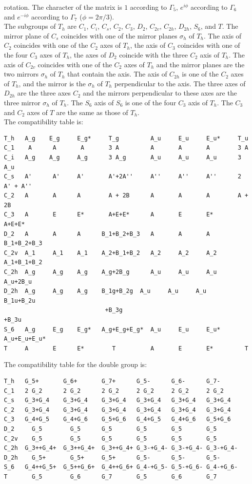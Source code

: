 \documentclass[12pt,a4paper]{article}
\begin{document}
rotation. The character of the matrix is $1$ according to 
$\Gamma_5$, $e^{i\phi}$ according to $\Gamma_6$ and $e^{-i\phi}$ according 
to $\Gamma_7$ ($\phi=2\pi/3$). \\
The subgroups of $T_h$ are $C_1$, $C_i$, $C_s$, $C_2$, $C_3$, $D_2$, $C_{2v}$,
$C_{2h}$, $D_{2h}$, $S_6$, and $T$. The mirror plane of $C_s$ coincides
with one of the mirror planes $\sigma_h$ of $T_h$. The axis of $C_2$ coincides 
with one of the $C_2$ axes of $T_h$, the axis of $C_3$ coincides with one of the four
$C_3$ axes of $T_h$, the axes of $D_2$ coincide with the three $C_2$ axis
of $T_h$. The axis of $C_{2v}$ coincides with one of the $C_2$ axes of 
$T_h$ and the mirror planes are the two mirrors $\sigma_h$ of $T_h$ that
contain the axis. The axis of $C_{2h}$ is one of the $C_2$ axes of $T_h$,
and the mirror is the $\sigma_h$ of $T_h$ perpendicular to the
axis. The three axes of $D_{2h}$ are the three axes $C_2$ and the mirrors
perpendicular to these axes are the three mirror $\sigma_h$ of $T_h$.
The $S_6$ axis of $S_6$ is one of the four $C_3$ axis of $T_h$.
The $C_3$ and $C_2$ axes of $T$ are the same as those of $T_h$. \\
The compatibility table is:
\begin{verbatim}
T_h   A_g    E_g     E_g*     T_g         A_u     E_u     E_u*     T_u
C_1    A      A       A       3 A         A       A       A        3 A
C_i   A_g    A_g     A_g      3 A_g       A_u     A_u     A_u      3 A_u
C_s   A'      A'     A'       A'+2A''     A''     A''     A''      2 A' + A''
C_2   A       A      A        A + 2B      A       A       A        A + 2B
C_3   A       E      E*       A+E+E*      A       E       E*       A+E+E*
D_2   A       A      A      B_1+B_2+B_3   A       A       A        B_1+B_2+B_3
C_2v  A_1     A_1    A_1    A_2+B_1+B_2   A_2     A_2     A_2      A_1+B_1+B_2
C_2h  A_g     A_g    A_g    A_g+2B_g      A_u     A_u     A_u      A_u+2B_u
D_2h  A_g     A_g    A_g    B_1g+B_2g  A_u     A_u     A_u         B_1u+B_2u
                             +B_3g                                   +B_3u
S_6   A_g     E_g    E_g*   A_g+E_g+E_g*  A_u     E_u     E_u*   A_u+E_u+E_u*
T     A       E      E*        T          A       E       E*         T
\end{verbatim}
The compatibility table for the double group is:
\begin{verbatim}
T_h   G_5+       G_6+       G_7+      G_5-      G_6-      G_7-
C_1   2 G_2      2 G_2      2 G_2     2 G_2     2 G_2     2 G_2
C_s   G_3+G_4    G_3+G_4    G_3+G_4   G_3+G_4   G_3+G_4   G_3+G_4
C_2   G_3+G_4    G_3+G_4    G_3+G_4   G_3+G_4   G_3+G_4   G_3+G_4
C_3   G_4+G_5    G_4+G_6    G_5+G_6   G_4+G_5   G_4+G_6   G_5+G_6
D_2     G_5        G_5      G_5       G_5       G_5       G_5
C_2v    G_5        G_5      G_5       G_5       G_5       G_5
C_2h  G_3++G_4+  G_3++G_4+  G_3++G_4+ G_3-+G_4- G_3-+G_4- G_3-+G_4-
D_2h    G_5+       G_5+     G_5+      G_5-      G_5-      G_5-
S_6   G_4++G_5+  G_5++G_6+  G_4++G_6+ G_4-+G_5- G_5-+G_6- G_4-+G_6-
T       G_5        G_6      G_7       G_5       G_6       G_7
\end{verbatim}
\end{document}
